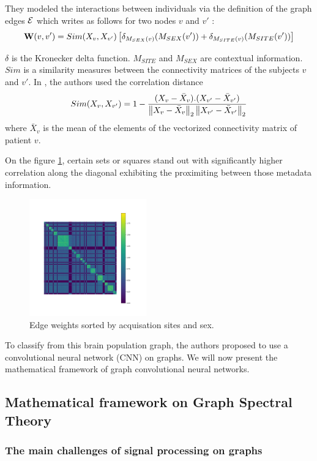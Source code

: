 They modeled the interactions between individuals via the definition of the graph edges $\mathcal{E}$ which writes as follows for two nodes $v$ and $v'$ :
$$ 
    \mathbf{W}(v, v') = Sim(X_v, X_{v'}) \left[\delta_{M_{SEX}(v)}(M_{SEX}(v')) + \delta_{M_{SITE}(v)}(M_{SITE}(v')) \right]
$$

$\delta$ is the Kronecker delta function.  $M_{SITE}$ and $M_{SEX}$ are contextual information. $Sim$ is a similarity measures between the connectivity matrices of the subjects $v$ and $v'$. In \cite{Parisot17}, the authors used the correlation distance 
$$
Sim(X_v, X_{v'}) =  1 - \frac{(X_v - \bar{X}_v).(X_{v'} - \bar{X}_{v'})}{\left\lVert X_v -\bar{X}_{v}\right\rVert_2\left\lVert X_{v'} - \bar{X}_{v'}\right\rVert_2}
$$
where $\bar{X}_v$ is the mean of the elements of the vectorized connectivity matrix of patient $v$. 

On the figure \ref{fig:sorted_adjacency}, certain sets or squares stand out with significantly higher correlation along the diagonal exhibiting the proximiting between those metadata information. 

\begin{figure}[h!]
    \centering
    \includegraphics[width=0.45\textwidth]{figures/sorted_adjacency_by_site_id_by_sex.png}
    \caption{Edge weights sorted by acquisation sites and sex.}
    \Description{}
    \label{fig:sorted_adjacency}
\end{figure}

To classify from this brain population graph, the authors \cite{Parisot17} proposed to use a convolutional neural network (CNN) on graphs. We will now present the mathematical framework of graph convolutional neural networks.

\subsection{Mathematical framework on Graph Spectral Theory}
\subsubsection{The main challenges of signal processing on graphs} 

